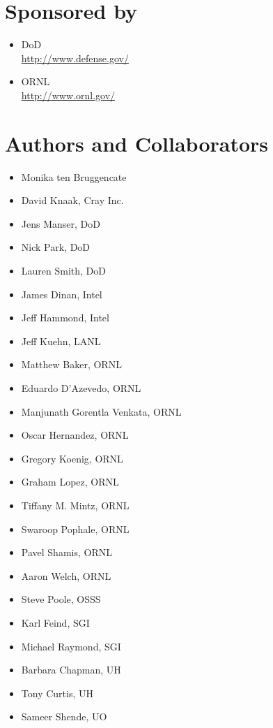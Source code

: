 \section*{Sponsored by}
\begin{itemize}
\item \ac{DoD}\\
  \url{http://www.defense.gov/ }
\item \ac{ORNL}\\
  \url{http://www.ornl.gov/} 
\end{itemize}

\section*{Authors and Collaborators}
\begin{itemize}
\item Monika ten Bruggencate
\item David Knaak, Cray Inc.
\item Jens Manser, \ac{DoD}
\item Nick Park, \ac{DoD}
\item Lauren Smith, \ac{DoD}
\item James Dinan, Intel
\item Jeff Hammond, Intel
\item Jeff Kuehn, \ac{LANL}
\item Matthew Baker, \ac{ORNL}
\item Eduardo D'Azevedo, \ac{ORNL}
\item Manjunath Gorentla Venkata, \ac{ORNL}
\item Oscar Hernandez, \ac{ORNL}
\item Gregory Koenig, \ac{ORNL}
\item Graham Lopez, \ac{ORNL}
\item Tiffany M. Mintz, \ac{ORNL}
\item Swaroop Pophale, \ac{ORNL}
\item Pavel Shamis, \ac{ORNL}
\item Aaron Welch, \ac{ORNL}
\item Steve Poole, OSSS
\item Karl Feind, SGI
\item Michael Raymond, SGI
\item Barbara Chapman, \ac{UH} 
\item Tony Curtis, \ac{UH}
\item Sameer Shende, \ac{UO}
\end{itemize}

